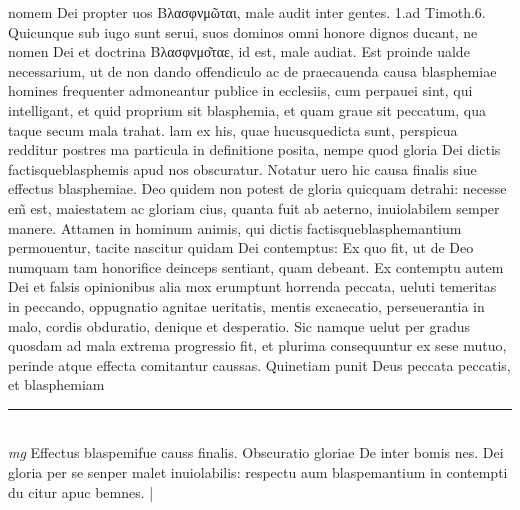 \documentclass{article}
\begin{document}
\begin{pages}
nomem Dei propter uos Βλασφνμῶται, male audit inter gentes. 1.ad Timoth.6. Quicunque  sub iugo sunt serui, suos dominos omni honore dignos ducant, ne nomen Dei et doctrina Βλασφνμο͂ταε, id est, male audiat. Est proinde ualde necessarium, ut de non dando offendiculo ac de praecauenda causa blasphemiae homines frequenter admoneantur publice in ecclesiis, cum perpauei sint, qui intelligant, et quid proprium sit blasphemia, et quam graue sit peccatum, qua taque  secum mala trahat. lam ex his, quae hucusquedicta sunt, perspicua redditur postres ma particula in definitione posita, nempe quod gloria Dei dictis factisqueblasphemis apud nos obscuratur. Notatur uero hic causa finalis siue effectus blasphemiae. Deo quidem non potest de gloria quicquam detrahi: necesse em̃ est, maiestatem ac gloriam cius, quanta fuit ab aeterno, inuiolabilem semper manere. Attamen in hominum animis, qui dictis factisqueblasphemantium permouentur, tacite nascitur quidam Dei contemptus: Ex quo fit, ut de Deo numquam tam honorifice deinceps sentiant, quam debeant. Ex contemptu autem Dei et falsis opinionibus alia mox erumptunt horrenda peccata, ueluti temeritas in peccando, oppugnatio agnitae ueritatis, mentis excaecatio, perseuerantia in malo, cordis obduratio, denique  et desperatio. Sic namque uelut per gradus quosdam ad mala extrema progressio fit, et plurima consequuntur ex sese mutuo, perinde atque effecta comitantur caussas. Quinetiam punit Deus peccata peccatis, et blasphemiam  \pend
\vspace{0.5cm}\noindent
\vspace{0.2cm}\rule{1cm}{0.2pt}\\ 
\hspace{0.2cm}\textit{mg}
\footnotesize Effectus blaspemifue causs finalis. Obscuratio gloriae De inter bomis nes.  Dei gloria per se senper malet inuiolabilis: respectu aum blaspemantium in contempti du citur apuc bemnes. 
\normalsize| 

\end{pages}
\end{document}
